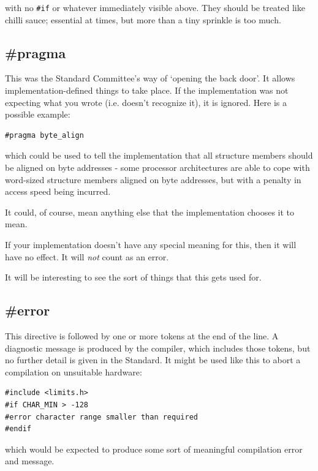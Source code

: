    with no \texttt{\#if} or whatever immediately visible above. They
    should be treated like chilli sauce; essential at times, but more than
    a tiny sprinkle is too much.


  

  \subsection{\#pragma}
   

   This was the Standard Committee's way of `opening the back
    door'. It allows implementation-defined things to take place. If the
    implementation was not expecting what you wrote (i.e. doesn't recognize
    it), it is ignored. Here is a possible example:


   \begin{Verbatim}
#pragma byte_align
\end{Verbatim}

   which could be used to tell the implementation that all structure
    members should be aligned on byte addresses - some processor
    architectures are able to cope with word-sized structure members aligned
    on byte addresses, but with a penalty in access speed being
    incurred.


   It could, of course, mean anything else that the implementation
    chooses it to mean.


   If your implementation doesn't have any special meaning for this, then
    it will have no effect. It will \textit{not} count as an error.


   It will be interesting to see the sort of things that this gets used
    for.


  

  \subsection{\#error}
   

   This directive is followed by one or more tokens at the end of the
    line. A diagnostic message is produced by the compiler, which includes
    those tokens, but no further detail is given in the Standard. It might
    be used like this to abort a compilation on unsuitable hardware:


   \begin{Verbatim}
#include <limits.h>
#if CHAR_MIN > -128
#error character range smaller than required
#endif
\end{Verbatim}

   which would be expected to produce some sort of meaningful compilation
    error and message.


